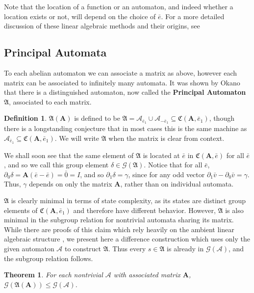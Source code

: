 \documentclass{article}
\newcommand{\A}{\mathcal{A}}
\newcommand{\G}{\mathcal{G}}
\renewcommand{\P}{\mathfrak{A}}
\newcommand{\C}{\mathfrak{C}(\Am,\e)}
\newcommand{\2}{\textbf{2}}
\newcommand{\Am}{\textbf{A}}
\newcommand{\del}{\partial}
\newcommand{\vv}{\bar{v}}
\newcommand{\e}{\bar{e}}
\newtheorem{thm}{Theorem}
\theoremstyle{definition}
\newtheorem{defn}{Definition}
\begin{document}
Note that the location of a function or an automaton, and indeed whether a 
location exists or not, will depend on the choice of $\e$. For a more detailed
discussion of these linear algebraic methods and their origins, see
\cite{Nekrashevych05:self_similar_groups,NekrashevychSidki04:automorphisms}

\subsection{Principal Automata}
To each abelian automaton we can associate a matrix as above, however each
matrix can be associated to infinitely many automata.
It was shown by Okano \cite{Okano15:thesis} that there is a 
distinguished automaton, now called the \textbf{Principal Automaton} $\P$, 
associated to each matrix. 

\begin{defn}
  $\P(\Am)$ is defined to be 
  $\P = \A_{\e_1} \cup \A_{-\e_1} \subseteq \mathfrak{C}(\Am, \e_1)$,
  though there is a longstanding conjecture that in most cases this is
  the same machine as $\A_{\e_1} \subseteq \mathfrak{C}(\Am, \e_1)$.
  We will write $\P$ when the matrix is clear from context. 
\end{defn}

We shall soon see that the same element of $\P$ is located at $\e$ in 
$\C$ for all $\e$, and so we call this group element $\delta \in \G(\P)$. 
Notice that for all $\e$, $\del_0 \delta = \Am(\e - \e) = \bar{0} = I$, and so
$\del_1 \delta = \gamma$, since for any odd vector 
$\del_1 \vv - \del_0 \vv = \gamma$. Thus, $\gamma$ depends on only the 
matrix $\Am$, rather than on individual automata.

$\P$ is clearly minimal in terms of state complexity, as its states are
distinct group elements of $\mathfrak{C}(\Am, \e_1)$ and therefore 
have different behavior. However, $\P$ is also minimal in the
subgroup relation for nontrivial automata sharing its matrix. 
While there are proofs of this claim which rely heavily on the
ambient linear algebraic structure \cite{Okano15:thesis}, 
we present here a difference construction which uses only the given 
automaton $\A$ to construct $\P$. Thus every $s \in \P$ is already in
$\G(\A)$, and the subgroup relation follows.

\begin{thm}
  For each nontrivial $\A$ with associated matrix $\Am$,\\
  $\G(\P(\Am)) \leq \G(\A)$.
\end{thm}
\end{document}
